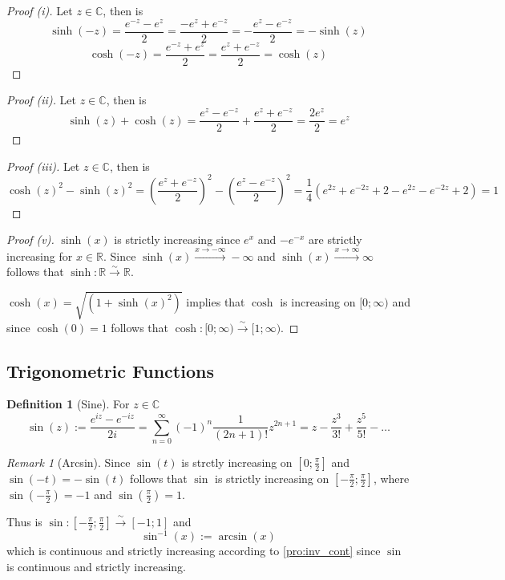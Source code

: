 \documentclass[english,titlepage]{uzhpub}
\theoremstyle{definition}
\newtheorem{definition}{Definition}[section]
\theoremstyle{plain}
\theoremstyle{remark}
\newtheorem*{remark}{Remark}
\theoremstyle{example}
\begin{document}
   \begin{proof}[Proof (i)]
      Let \(z \in \mathbb{C}\), then is
      \[\sinh(-z) = \frac{e^{-z} - e^z}{2} = \frac{-e^z + e^{-z}}{2} = -\frac{e^z - e^{-z}}{2} = -\sinh(z)\]
      \[\cosh(-z) = \frac{e^{-z} + e^z}{2} = \frac{e^z + e^{-z}}{2} = \cosh(z)\]
   \end{proof}

   \begin{proof}[Proof (ii)]
      Let \(z \in \mathbb{C}\), then is
      \[\sinh(z) + \cosh(z) = \frac{e^z - e^{-z}}{2} + \frac{e^z + e^{-z}}{2} = \frac{2 e^z}{2} = e^z\]
   \end{proof}

   \begin{proof}[Proof (iii)]
      Let \(z \in \mathbb{C}\), then is
      \[\cosh(z)^2 - \sinh(z)^2 = \left(\frac{e^z + e^{-z}}{2}\right)^2 - \left(\frac{e^z - e^{-z}}{2}\right)^2 = \frac{1}{4} (e^{2z} + e^{-2z} + 2 - e^{2z} - e^{-2z} + 2) = 1\]
   \end{proof}

   \begin{proof}[Proof (v)]
      \(\sinh(x)\) is strictly increasing since \(e^x\) and \(-e^{-x}\) are strictly increasing for \(x \in \mathbb{R}\).
      Since \(\sinh(x) \xrightarrow{x \to -\infty} -\infty\) and \(\sinh(x) \xrightarrow{x \to \infty} \infty\) follows that \(\sinh: \mathbb{R} \xrightarrow{\sim} \mathbb{R}\).

      \(\cosh(x) = \sqrt{(1 + \sinh(x)^2)}\) implies that \(\cosh\) is increasing on \([0;\infty)\) and since \(\cosh(0) = 1\) follows that \(\cosh: [0; \infty) \xrightarrow{\sim} [1;\infty)\).
   \end{proof}

   \subsection{Trigonometric Functions}
   \begin{definition}[Sine]
      For \(z \in \mathbb{C}\)
      \[\sin(z) := \frac{e^{iz} - e^{-iz}}{2i} = \sum_{n=0}^\infty (-1)^n \frac{1}{(2n+1)!} z^{2n + 1} = z - \frac{z^3}{3!} + \frac{z^5}{5!} - \ldots\]
   \end{definition}
   \begin{remark}[Arcsin]
      Since \(\sin(t)\) is strctly increasing on \(\left[0; \frac{\pi}{2}\right]\) and \(\sin(-t) = -\sin(t)\) follows that \(\sin\) is strictly increasing on \(\left[-\frac{\pi}{2}; \frac{\pi}{2}\right]\), where \(\sin\left(-\frac{\pi}{2}\right) = -1\) and \(\sin\left(\frac{\pi}{2}\right) = 1\).

      Thus is \(\sin: \left[-\frac{\pi}{2}; \frac{\pi}{2}\right] \xrightarrow{\sim} [-1; 1]\) and
      \[\sin^{-1}(x) := \arcsin(x)\]
      which is continuous and strictly increasing according to \cref{pro:inv_cont} since \(\sin\) is continuous and strictly increasing.
   \end{remark}
\end{document}
